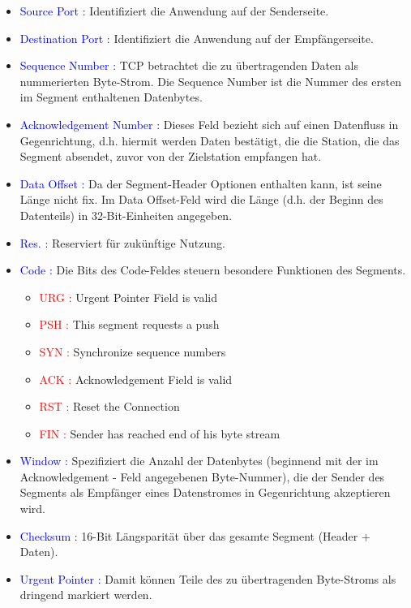 \begin{itemize}
    \item \textcolor{blue}{Source Port :} Identifiziert die Anwendung auf der Senderseite.
    \item \textcolor{blue}{Destination Port :} Identifiziert die Anwendung auf der Empfängerseite.
    \item \textcolor{blue}{Sequence Number :} TCP betrachtet die zu übertragenden Daten als nummerierten Byte-Strom. Die Sequence Number ist die Nummer des ersten im Segment enthaltenen Datenbytes.
    \item \textcolor{blue}{Acknowledgement Number :} Dieses Feld bezieht sich auf einen Datenfluss in Gegenrichtung, d.h. hiermit werden Daten bestätigt, die die Station, die das Segment absendet, zuvor von der Zielstation empfangen hat.
    \item \textcolor{blue}{Data Offset :} Da der Segment-Header Optionen enthalten kann, ist seine Länge nicht fix. Im Data Offset-Feld wird die Länge (d.h. der Beginn des Datenteils) in 32-Bit-Einheiten angegeben.
    \item \textcolor{blue}{Res. :} Reserviert für zukünftige Nutzung.
    \item \textcolor{blue}{Code :} Die Bits des Code-Feldes steuern besondere Funktionen des Segments.
    \begin{itemize}
        \item \textcolor{red}{URG :} Urgent Pointer Field is valid
        \item \textcolor{red}{PSH :} This segment requests a push
        \item \textcolor{red}{SYN :} Synchronize sequence numbers
        \item \textcolor{red}{ACK :} Acknowledgement Field is valid
        \item \textcolor{red}{RST :} Reset the Connection
        \item \textcolor{red}{FIN :} Sender has reached end of his byte stream
    \end{itemize}
    \item \textcolor{blue}{Window :} Spezifiziert die Anzahl der Datenbytes (beginnend mit der im Acknowledgement - Feld angegebenen Byte-Nummer), die der Sender des Segments als Empfänger eines Datenstromes in Gegenrichtung akzeptieren wird.
    \item \textcolor{blue}{Checksum :} 16-Bit Längsparität über das gesamte Segment (Header + Daten).
    \item \textcolor{blue}{Urgent Pointer :} Damit können Teile des zu übertragenden Byte-Stroms als dringend markiert werden.
\end{itemize}

